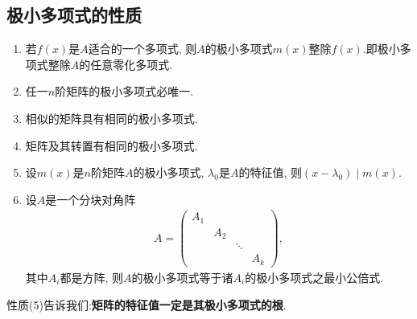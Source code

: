 \documentclass[../../main.tex]{subfiles}%
\begin{document}
\subsection{极小多项式的性质}

\begin{proposition}[极小多项式的性质]\label{proposition:极小多项式的性质}
\begin{enumerate}[(1)]
\item 若$f(x)$是$A$适合的一个多项式, 则$A$的极小多项式$m(x)$整除$f(x)$.即极小多项式整除$A$的任意零化多项式.

\item 任一$n$阶矩阵的极小多项式必唯一.

\item 相似的矩阵具有相同的极小多项式.

\item 矩阵及其转置有相同的极小多项式.

\item 设$m(x)$是$n$阶矩阵$A$的极小多项式, $\lambda_0$是$A$的特征值, 则$(x - \lambda_0) \mid m(x)$.

\item\label{proposition:极小多项式的性质-6} 设$A$是一个分块对角阵
\begin{align*}
A = \begin{pmatrix}
A_1 & & \\
& A_2 & \\
& & \ddots & \\
& & & A_k
\end{pmatrix},
\end{align*}
其中$A_i$都是方阵, 则$A$的极小多项式等于诸$A_i$的极小多项式之最小公倍式.
\end{enumerate}
\end{proposition}
\begin{note}
性质(5)告诉我们:\textbf{矩阵的特征值一定是其极小多项式的根}.
\end{note}
\end{document}
